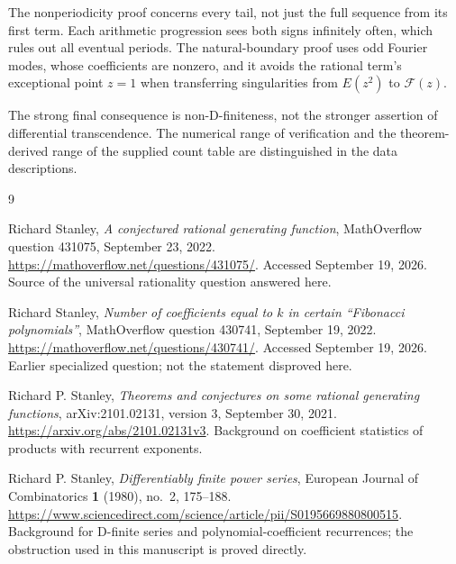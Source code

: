 \documentclass[11pt]{article}
\theoremstyle{definition}\newtheorem{definition}[theorem]{Definition}
\theoremstyle{remark}\newtheorem{remark}[theorem]{Remark}
\newcommand{\F}{\mathcal F}
\begin{document}
The nonperiodicity proof concerns every tail, not just the full sequence from its first term. Each arithmetic progression sees both signs infinitely often, which rules out all eventual periods. The natural-boundary proof uses odd Fourier modes, whose coefficients are nonzero, and it avoids the rational term's exceptional point $z=1$ when transferring singularities from $E(z^2)$ to $\F(z)$.

The strong final consequence is non-D-finiteness, not the stronger assertion of differential transcendence. The numerical range of verification and the theorem-derived range of the supplied count table are distinguished in the data descriptions.

\begin{thebibliography}{9}

Richard Stanley,
\emph{A conjectured rational generating function},
MathOverflow question 431075, September 23, 2022.
\url{https://mathoverflow.net/questions/431075/}.
Accessed September 19, 2026. Source of the universal rationality question answered here.

Richard Stanley,
\emph{Number of coefficients equal to $k$ in certain ``Fibonacci polynomials''},
MathOverflow question 430741, September 19, 2022.
\url{https://mathoverflow.net/questions/430741/}.
Accessed September 19, 2026. Earlier specialized question; not the statement disproved here.

Richard P. Stanley,
\emph{Theorems and conjectures on some rational generating functions},
arXiv:2101.02131, version 3, September 30, 2021.
\url{https://arxiv.org/abs/2101.02131v3}.
Background on coefficient statistics of products with recurrent exponents.

Richard P. Stanley,
\emph{Differentiably finite power series},
European Journal of Combinatorics \textbf{1} (1980), no.~2, 175--188.
\url{https://www.sciencedirect.com/science/article/pii/S0195669880800515}.
Background for D-finite series and polynomial-coefficient recurrences; the obstruction used in this manuscript is proved directly.

\end{thebibliography}
\end{document}
